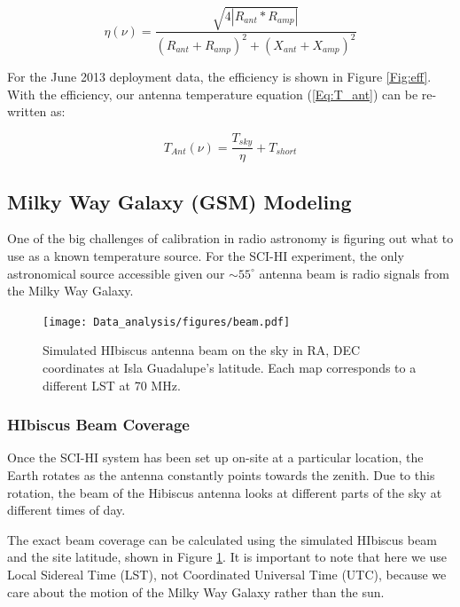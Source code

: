 \begin{equation}
\eta (\nu) = \frac{\sqrt{4 |R_{ant}*R_{amp}|}}{(R_{ant}+R_{amp})^2+(X_{ant}+X_{amp})^2}
\end{equation}

For the June 2013 deployment data, the efficiency is shown in Figure \ref{Fig:eff}. With the efficiency, our antenna temperature equation (\ref{Eq:T_ant}) can be re-written as:

\begin{equation}
T_{Ant}(\nu) = \frac{T_{sky}}{\eta} + T_{short}
\end{equation}


\subsection{Milky Way Galaxy (GSM) Modeling} \label{Sec:model}

One of the big challenges of calibration in radio astronomy is figuring out what to use as a known temperature source. For the SCI-HI experiment, the only astronomical source accessible given our $\sim 55 ^\circ$ antenna beam is radio signals from the Milky Way Galaxy. 

\begin{figure}[htb]
\begin{center}
\texttt{[image: Data\_analysis/figures/beam.pdf]}
\caption{Simulated HIbiscus antenna beam on the sky in RA, DEC coordinates at Isla Guadalupe's latitude. Each map corresponds to a different LST at 70 MHz. }
\label{Fig:HIbiscus_beam}
\end{center}
\end{figure}

\subsubsection{HIbiscus Beam Coverage}

Once the SCI-HI system has been set up on-site at a particular location, the Earth rotates as the antenna constantly points towards the zenith. Due to this rotation, the beam of the Hibiscus antenna looks at different parts of the sky at different times of day. 

The exact beam coverage can be calculated using the simulated HIbiscus beam and the site latitude, shown in Figure \ref{Fig:HIbiscus_beam}.  It is important to note that here we use Local Sidereal Time (LST), not Coordinated Universal Time (UTC), because we care about the motion of the Milky Way Galaxy rather than the sun.  

